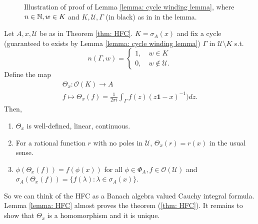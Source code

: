 \documentclass{article}
\begin{document}
\begin{figure}[H]
        \centering
        
        \caption{Illustration of proof of Lemma \ref{lemma: cycle winding lemma}, where $n\in \mathbb{N}, w\in K$ and $K, \mathcal{U}, \Gamma$ (in black) as in in the lemma.}
        \label{fig: proof of winding lemma}
    \end{figure}

\begin{boxlemma}\label{lemma: HFC}
     Let $A, x, \mathcal{U}$ be as in Theorem \ref{thm: HFC}. $K = \sigma_A(x)$ and fix a cycle (guaranteed to exists by Lemma \ref{lemma: cycle winding lemma}) $\Gamma$ in $\mathcal{U}\setminus K$ s.t. $$n(\Gamma,w) = \begin{cases}
        1, \quad w\in K\\
        0, \quad w\not\in \mathcal{U}.
    \end{cases}$$
    Define the map 
    $$
    \begin{array}{mm}
         \Theta_x: \mathcal{O}(K)\to A  \\
         f\mapsto \Theta_x(f) = \frac{1}{2\pi i}\displaystyle\int_{\Gamma}f(z)(z\mathbf{1}-x)^{-1})dz.
    \end{array}
    $$
    Then, 
    \begin{enumerate}[label = (\roman*), align = left]
        \item $\Theta_x$ is well-defined, linear, continuous.
        \item For a rational function $r$ with no poles in $\mathcal{U}$, $\Theta_x(r) = r(x)$ in the usual sense.
        \item $\phi\left(\Theta_x(f)\right) = f(\phi(x))$ for all $\phi\in \Phi_A, f\in \mathcal{O}(\mathcal{U})$ and $\sigma_A\left(\Theta_x(f)\right) = \{f(\lambda):\lambda\in \sigma_A(x)\}$.
    \end{enumerate}
\end{boxlemma}

\begin{remark}
    So we can think of the HFC as a Banach algebra valued Cauchy integral formula. Lemma \ref{lemma: HFC} almost proves the theorem (\ref{thm: HFC}). It remains to show that $\Theta_x$ is a homomorphism and it is unique. 
\end{remark}
\end{document}
